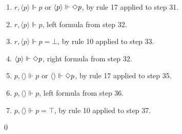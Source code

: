 \begin{myEx}
\begin{enumerate}
\item $r, \langle p \rangle \Vdash p$ or $\langle p \rangle \Vdash \Diamond p$, by rule 17 applied to step 31.\\ %

\item $r, \langle p \rangle \Vdash p$, left formula from step 32.\\ %

\item $r, \langle p \rangle \Vdash p = \bot$, by rule 10 applied to step 33.\\ %

\item $\langle p \rangle \Vdash \Diamond p$, right formula from step 32.\\ %

\item $p, \langle \rangle \Vdash p$ or $ \langle \rangle \Vdash \Diamond p$, by rule 17 applied to step 35.\\ %

\item $p, \langle \rangle \Vdash p$, left formula from step 36.\\ %

\item $p, \langle \rangle \Vdash p = \top$, by rule 10 applied to step 37.%
\end{enumerate}
\qed
\end{myEx}

